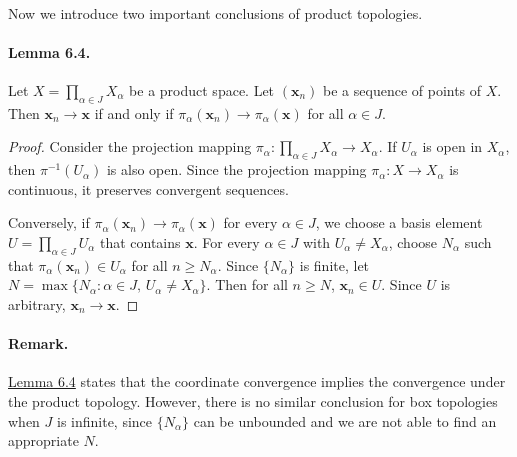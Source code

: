 \documentclass{article}
\numberwithin{equation}{section}
\theoremstyle{plain}
\theoremstyle{definition}
\begin{document}
\paragraph{} Now we introduce two important conclusions of product topologies.

\paragraph{Lemma 6.4.\label{lemma:6.4}} Let $X=\prod_{\alpha\in J}X_\alpha$ be a product space. Let $(\mathbf{x}_n)$ be a sequence of points of $X$. Then $\mathbf{x}_n\to\mathbf{x}$ if and only if $\pi_\alpha(\mathbf{x}_n)\to\pi_\alpha(\mathbf{x})$ for all $\alpha\in J$.
\begin{proof}
Consider the projection mapping $\pi_\alpha:\prod_{\alpha\in J}X_\alpha\to X_\alpha$. If $U_\alpha$ is open in $X_\alpha$, then $\pi^{-1}(U_\alpha)$ is also open. Since the projection mapping $\pi_\alpha:X\to X_\alpha$ is continuous, it preserves convergent sequences. 

Conversely, if $\pi_\alpha(\mathbf{x}_n)\to\pi_\alpha(\mathbf{x})$ for every $\alpha\in J$, we choose a basis element $U=\prod_{\alpha\in J}U_\alpha$ that contains $\mathbf{x}$. For every $\alpha\in J$ with $U_\alpha\neq X_\alpha$, choose $N_\alpha$ such that $\pi_\alpha(\mathbf{x}_n)\in U_\alpha$ for all $n\geq N_\alpha$. Since $\{N_\alpha\}$ is finite, let $N=\max\{N_\alpha:\alpha\in J,\,U_\alpha\neq X_\alpha\}$. Then for all $n\geq N$, $\mathbf{x}_n\in U$. Since $U$ is arbitrary, $\mathbf{x}_n\to\mathbf{x}$.
\end{proof}

\paragraph{Remark.} \hyperref[lemma:6.4]{Lemma 6.4} states that the coordinate convergence implies the convergence under the product topology. However, there is no similar conclusion for box topologies when $J$ is infinite, since $\{N_\alpha\}$ can be unbounded and we are not able to find an appropriate $N$.
\end{document}
